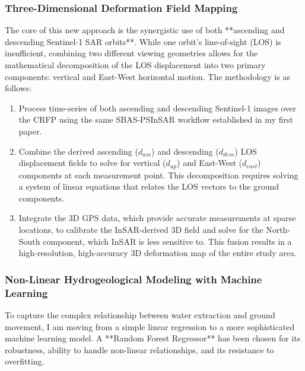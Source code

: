\documentclass[12pt, a4paper]{article}
\begin{document}
	\subsubsection{Three-Dimensional Deformation Field Mapping}
	The core of this new approach is the synergistic use of both **ascending and descending Sentinel-1 SAR orbits**. While one orbit's line-of-sight (LOS) is insufficient, combining two different viewing geometries allows for the mathematical decomposition of the LOS displacement into two primary components: vertical and East-West horizontal motion. The methodology is as follows:
	\begin{enumerate}
		\item Process time-series of both ascending and descending Sentinel-1 images over the CRFP using the same SBAS-PSInSAR workflow established in my first paper.
		\item Combine the derived ascending ($d_{asc}$) and descending ($d_{desc}$) LOS displacement fields to solve for vertical ($d_{up}$) and East-West ($d_{east}$) components at each measurement point. This decomposition requires solving a system of linear equations that relates the LOS vectors to the ground components.
		\item Integrate the 3D GPS data, which provide accurate measurements at sparse locations, to calibrate the InSAR-derived 3D field and solve for the North-South component, which InSAR is less sensitive to. This fusion results in a high-resolution, high-accuracy 3D deformation map of the entire study area.
	\end{enumerate}
	
	\subsubsection{Non-Linear Hydrogeological Modeling with Machine Learning}
	To capture the complex relationship between water extraction and ground movement, I am moving from a simple linear regression to a more sophisticated machine learning model. A **Random Forest Regressor** has been chosen for its robustness, ability to handle non-linear relationships, and its resistance to overfitting.
	
\end{document}
